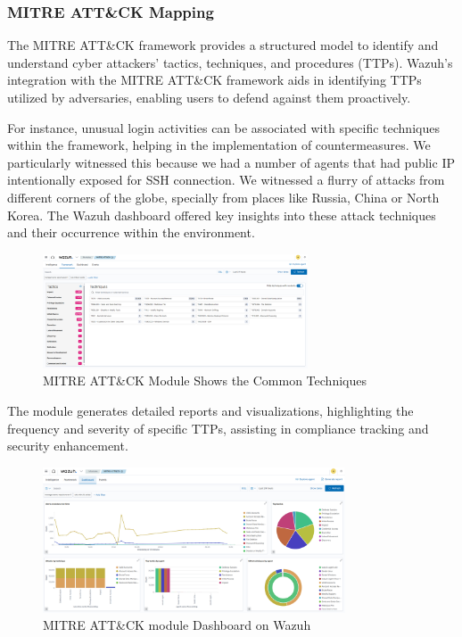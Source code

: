 \subsubsection{MITRE ATT\&CK Mapping}

The MITRE ATT\&CK framework provides a structured model to identify and understand cyber attackers' tactics, techniques, and procedures (TTPs). Wazuh's integration with the MITRE ATT\&CK framework aids in identifying TTPs utilized by adversaries, enabling users to defend against them proactively.

For instance, unusual login activities can be associated with specific techniques within the framework, helping in the implementation of countermeasures. We particularly witnessed this because we had a number of agents that had public IP intentionally exposed for SSH connection. We witnessed a flurry of attacks from different corners of the globe, specially from places like Russia, China or North Korea. The Wazuh dashboard offered key insights into these attack techniques and their occurrence within the environment.

\begin{figure}[H]
    \centering
    \includegraphics[width=0.7\textwidth]{images/threat-hunting/mitre-techniques.png}
    \caption{MITRE ATT\&CK Module Shows the Common Techniques}
    \label{fig:mitre-attack-techniques}
\end{figure}

The module generates detailed reports and visualizations, highlighting the frequency and severity of specific TTPs, assisting in compliance tracking and security enhancement.

\begin{figure}[H]
    \centering
    \includegraphics[width=0.8\textwidth]{images/threat-hunting/mitre-dashboard.png}
    \caption{MITRE ATT\&CK module Dashboard on Wazuh}
    \label{fig:mitre-attack-dashboard}
\end{figure}

